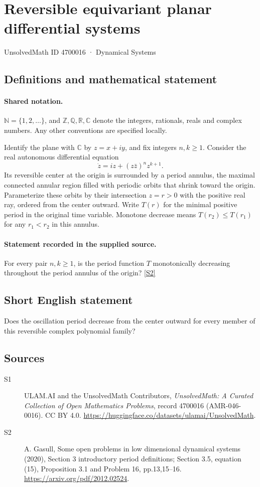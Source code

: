 \documentclass[11pt]{article}
\newcommand{\sref}[2]{\hyperlink{source:#1:#2}{[S#2]}}
\begin{document}
\setcounter{section}{4700015}
\section{Reversible equivariant planar differential systems}\label{4700016}
{\small\sffamily UnsolvedMath ID 4700016 · Dynamical Systems}
\subsection{Definitions and mathematical statement}

\paragraph{Shared notation.}$\mathbb N=\{1,2,\ldots\}$, and $\mathbb Z,\mathbb Q,\mathbb R,\mathbb C$ denote the integers, rationals, reals and complex numbers. Any other conventions are specified locally.


Identify the plane with $\mathbb C$ by $z=x+iy$, and fix integers $n,k\ge1$. Consider the real autonomous differential equation \[\dot z=iz+(z\bar z)^n z^{k+1}.\] Its reversible center at the origin is surrounded by a period annulus, the maximal connected annular region filled with periodic orbits that shrink toward the origin. Parameterize these orbits by their intersection $z=r>0$ with the positive real ray, ordered from the center outward. Write $T(r)$ for the minimal positive period in the original time variable. Monotone decrease means $T(r_2)\le T(r_1)$ for any $r_1<r_2$ in this annulus.
\paragraph{Statement recorded in the supplied source.}
For every pair $n,k\ge1$, is the period function $T$ monotonically decreasing throughout the period annulus of the origin? \sref{4700016}{2}
\subsection{Short English statement}
Does the oscillation period decrease from the center outward for every member of this reversible complex polynomial family?
\subsection{Sources}
\begin{description}
\item[\hypertarget{source:4700016:1}{S1}] ULAM.AI and the UnsolvedMath Contributors, \emph{UnsolvedMath: A Curated Collection of Open Mathematics Problems}, record 4700016 (AMR-046-0016). CC BY 4.0. \url{https://huggingface.co/datasets/ulamai/UnsolvedMath}.
\item[\hypertarget{source:4700016:2}{S2}] A. Gasull, Some open problems in low dimensional dynamical systems (2020), Section 3 introductory period definitions; Section 3.5, equation (15), Proposition 3.1 and Problem 16, pp.13,15--16. \url{https://arxiv.org/pdf/2012.02524}.
\end{description}
\label{end:4700016}
\end{document}
